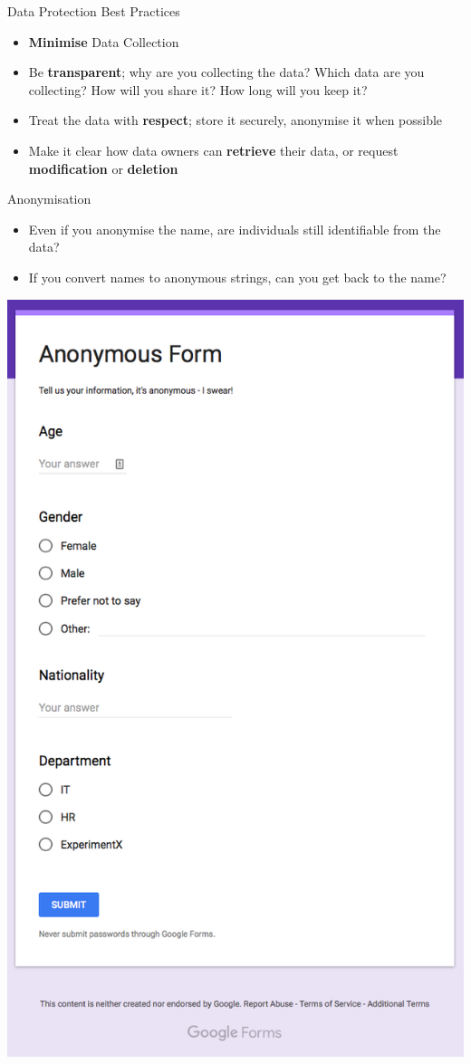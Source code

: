 \documentclass{beamer}
\begin{document}
\begin{frame}{Data Protection}
Best Practices
\begin{itemize}
\item \textbf{Minimise} Data Collection
\item Be \textbf{transparent}; why are you collecting the data? Which data are you collecting? How will you share it? How long will you keep it?
\item Treat the data with \textbf{respect}; store it securely, anonymise it when possible
\item Make it clear how data owners can \textbf{retrieve} their data, or request \textbf{modification} or \textbf{deletion}
\end{itemize}
\end{frame}

\begin{frame}{Anonymisation}
\begin{itemize}
\item Even if you anonymise the name, are individuals still identifiable from the data?
\item If you convert names to anonymous strings, can you get back to the name?  
\end{itemize}
\end{frame}

\begin{frame}{}
\begin{center}
\includegraphics[width=0.45\linewidth]{anonymous-form.png}
\end{center}
\end{frame}
\end{document}

